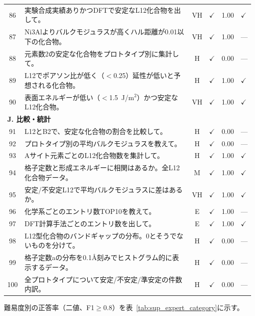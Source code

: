 \documentclass[5p,twocolumn]{elsarticle}
\begin{document}
\begin{longtable}{clcccl}
    86 & 実験合成実績ありかつDFTで安定なL12化合物を出して。 & VH & $\checkmark$ & 1.00 & $\checkmark$ \\
    87 & Ni3Alよりバルクモジュラスが高くハル距離が0.01以下の化合物。 & VH & $\checkmark$ & 1.00 & ---\\
    88 & 元素数2の安定な化合物をプロトタイプ別に集計して。 & H & $\checkmark$ & 0.00 & --- \\
    89 & L12でポアソン比が低く（$<$0.25）延性が低いと予想される化合物。 & H & $\checkmark$ & 1.00 & $\checkmark$ \\
    90 & 表面エネルギーが低い（$<$1.5~J/m$^2$）かつ安定なL12化合物。 & VH & $\checkmark$ & 1.00 & $\checkmark$ \\
    \midrule
    \multicolumn{6}{l}{\textbf{J. 比較・統計}} \\
    \midrule
    91 & L12とB2で、安定な化合物の割合を比較して。 & H & $\checkmark$ & 0.00 & --- \\
    92 & プロトタイプ別の平均バルクモジュラスを教えて。 & H & $\checkmark$ & 0.00 & --- \\
    93 & Aサイト元素ごとのL12化合物数を集計して。 & H & $\checkmark$ & 1.00 & $\checkmark$\\
    94 & 格子定数と形成エネルギーに相関はあるか。全L12化合物データ。 & M & $\checkmark$ & 1.00 & $\checkmark$ \\
    95 & 安定/不安定L12で平均バルクモジュラスに差はあるか。 & VH & $\checkmark$ & 1.00 & $\checkmark$ \\
    96 & 化学系ごとのエントリ数TOP10を教えて。 & E & $\checkmark$ & 1.00 & ---\\
    97 & DFT計算手法ごとのエントリ数を出して。 & E & $\checkmark$ & 1.00 & $\checkmark$ \\
    98 & L12型化合物のバンドギャップの分布。0とそうでないものを分けて。 & H & $\checkmark$ & 0.00 & --- \\
    99 & 格子定数aの分布を0.1\AA 刻みでヒストグラム的に表示するデータ。 & H & $\checkmark$ & 0.00 & --- \\
    100 & 全プロトタイプについて安定/不安定/準安定の件数内訳。 & H & $\checkmark$ & 0.00 & --- \\
\end{longtable}

難易度別の正答率（二値、F1$\geq 0.8$）を表~\ref{tab:sup_expert_category}に示す。
\end{document}
